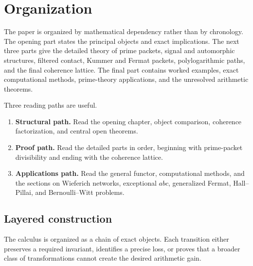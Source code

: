 
\chapter*{Organization}
The paper is organized by mathematical dependency rather than by chronology. The opening part states the principal objects and exact implications. The next three parts give the detailed theory of prime packets, signal and automorphic structures, filtered contact, Kummer and Fermat packets, polylogarithmic paths, and the final coherence lattice. The final part contains worked examples, exact computational methods, prime-theory applications, and the unresolved arithmetic theorems.

Three reading paths are useful.
\begin{enumerate}[leftmargin=1.5em]
\item \textbf{Structural path.} Read the opening chapter, object comparison, coherence factorization, and central open theorems.
\item \textbf{Proof path.} Read the detailed parts in order, beginning with prime-packet divisibility and ending with the coherence lattice.
\item \textbf{Applications path.} Read the general functor, computational methods, and the sections on Wieferich networks, exceptional $abc$, generalized Fermat, Hall--Pillai, and Bernoulli--Witt problems.
\end{enumerate}

\tableofcontents
\mainmatter


\section{Layered construction}
The calculus is organized as a chain of exact objects. Each transition either preserves a required invariant, identifies a precise loss, or proves that a broader class of transformations cannot create the desired arithmetic gain.

